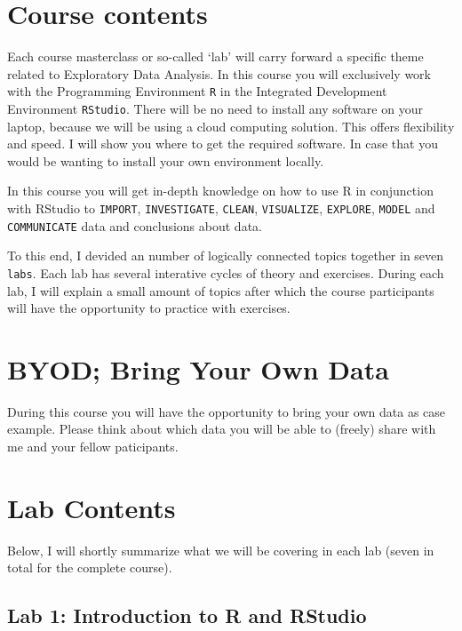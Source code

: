 \documentclass[]{book}
\begin{document}
\hypertarget{course-contents-1}{%
\section{Course contents}\label{course-contents-1}}

Each course masterclass or so-called `lab' will carry forward a specific theme related to Exploratory Data Analysis. In this course you will exclusively work with the Programming Environment \texttt{R} in the Integrated Development Environment \texttt{RStudio}. There will be no need to install any software on your laptop, because we will be using a cloud computing solution. This offers flexibility and speed. I will show you where to get the required software. In case that you would be wanting to install your own environment locally.

In this course you will get in-depth knowledge on how to use R in conjunction with RStudio to \texttt{IMPORT}, \texttt{INVESTIGATE}, \texttt{CLEAN}, \texttt{VISUALIZE}, \texttt{EXPLORE}, \texttt{MODEL} and \texttt{COMMUNICATE} data and conclusions about data.

To this end, I devided an number of logically connected topics together in seven \texttt{labs}. Each lab has several interative cycles of theory and exercises. During each lab, I will explain a small amount of topics after which the course participants will have the opportunity to practice with exercises.

\hypertarget{byod-bring-your-own-data}{%
\section{BYOD; Bring Your Own Data}\label{byod-bring-your-own-data}}

During this course you will have the opportunity to bring your own data as case example. Please think about which data you will be able to (freely) share with me and your fellow paticipants.

\hypertarget{lab-contents}{%
\section{Lab Contents}\label{lab-contents}}

Below, I will shortly summarize what we will be covering in each lab (seven in total for the complete course).

\hypertarget{lab-1-introduction-to-r-and-rstudio}{%
\subsection{Lab 1: Introduction to R and RStudio}\label{lab-1-introduction-to-r-and-rstudio}}
\end{document}
